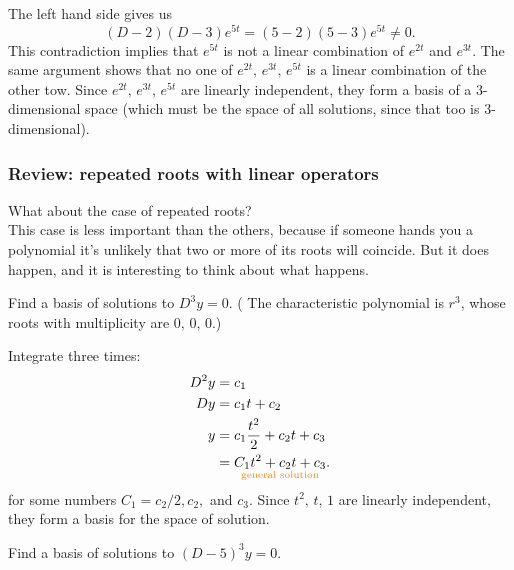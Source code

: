 The left hand side gives us
\begin{equation*}
  (D-2)(D-3)e^{5t} = (5-2)(5-3) e^{5t} \neq 0.
\end{equation*}
This contradiction implies that $e^{5t}$ is not a linear combination of $e^{2t}$ and $e^{3t}$.
The same argument shows that no one of $e^{2t}, \, e^{3t} , \, e^{5t}$ is a linear combination
of the other tow. Since $e^{2t}, \, e^{3t} , \, e^{5t}$ are linearly independent,
they form a basis of a $3$-dimensional space (which must be the space of all solutions,
since that too is $3$-dimensional). 
\clearpage

\subsubsection{Review: repeated roots with linear operators}

What about the case of repeated roots?\\

This case is less important than the others,
because if someone hands you a polynomial it's unlikely that two or more of its roots will coincide.
But it does happen, and it is interesting to think about what happens.\\

\begin{example}
  Find a basis of solutions to $D^3 y=0$. (
  The characteristic polynomial is $r^3$, whose roots with multiplicity are
  $0,\, 0,\, 0$.) 
\end{example}

\Solution Integrate three times:
\begin{align*}
  D^2 y &= c_1\\
  Dy &= c_1 t + c_2 \\
  y &= c_1 \frac{t^2}{2} + c_2 t + c_3 \\
  \displaystyle &= \underset {{\color{orange}{\textrm{general solution}}} }{C_1 t^2 + c_2 t + c_3}.          
\end{align*}
for some numbers $C_1=c_2 / 2, c_2,$ and $c_3$.
Since $t^2,\, t,\, 1$ are linearly independent, they form a basis for the space of solution.
\begin{example}
  Find a basis of solutions to $(D - 5)^3 y = 0$. 
\end{example}

